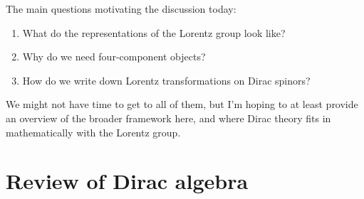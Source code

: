 \documentclass[12pt, oneside]{article}   	%
\theoremstyle{definition}
\begin{document}

%


The main questions motivating the discussion today: 
\begin{enumerate}
	\item What do the representations of the Lorentz group look like?
	\item Why do we need four-component objects?
	\item How do we write down Lorentz transformations on Dirac spinors?
\end{enumerate}
We might not have time to get to all of them, but I'm hoping to at least provide an overview of the broader framework here, and where Dirac theory fits in mathematically with the Lorentz group.

\section*{Review of Dirac algebra}
\end{document}
